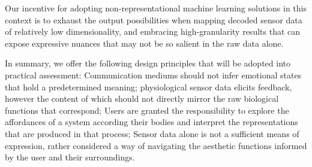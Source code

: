 Our incentive for adopting non-representational machine learning solutions in this context is to exhaust the output possibilities when mapping decoded sensor data of relatively low dimensionality, and embracing high-granularity results that can expose expressive nuances that may not be so salient in the raw data alone.


In summary, we offer the following design principles that will be adopted into practical assessment: Communication mediums should not infer emotional states that hold a predetermined meaning; physiological sensor data elicits feedback, however the content of which should not directly mirror the raw biological functions that correspond; Users are granted the responsibility to explore the affordances of a system according their bodies and interpret the representations that are produced in that process; Sensor data alone is not a sufficient means of expression, rather considered a way of navigating the aesthetic functions informed by the user and their surroundings.
